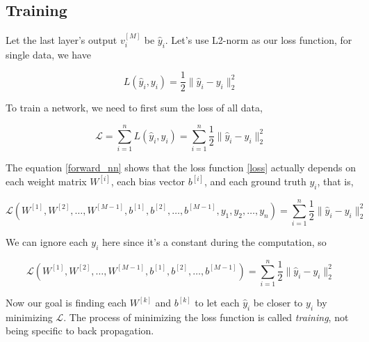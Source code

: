 \documentclass{article}
\begin{document}
        \subsection{Training}

            Let the last layer's output $v_i^{ [M] }$ be $\hat{y}_{i}$. Let's
            use L2-norm as our loss function, for single data, we have

            \begin{equation}\label{loss}
                L(\hat{y}_i, y_i) = \frac{1}{2} \| \hat{y}_i - y_i \|_2^2
            \end{equation}

            To train a network, we need to first sum the loss of all data,

            \begin{equation*}
                \mathcal{L} = \sum_{i=1}^n L(\hat{y}_{i}, y_{i}) =
                \sum_{i=1}^n \frac{1}{2} \| \hat{y}_{i} - y_i \|_2^2
            \end{equation*}

            The equation \ref{forward_nn} shows that the loss function
            \ref{loss} actually depends on each weight matrix $W^{[i]}$, each
            bias vector $b^{ [i] }$, and each ground truth $y_{i}$, that is,

            \begin{equation*}
                \mathcal{L}(W^{ [1] }, W^{ [2] }, \dots, W^{ [M-1] }, b^{ [1] },b^{ [2] },
                \dots, b^{ [M-1] }, y_{1}, y_{2}, \dots, y_n) = \sum_{i=1}^n \frac{1}{2} \| \hat{y}_{i} - y_i \|_2^2
            \end{equation*}

            We can ignore each $y_{i}$ here since it's a constant during the computation, so

            \begin{equation*}
                \mathcal{L}(W^{ [1] }, W^{ [2] }, \dots, W^{ [M-1] }, b^{ [1] },b^{ [2] },
                \dots, b^{ [M-1] }) = \sum_{i=1}^n \frac{1}{2} \| \hat{y}_{i} - y_i \|_2^2
            \end{equation*}
            
            Now our goal is finding each  $W^{ [k] }$ and $b^{ [k] }$ to let
            each $\hat{y}_{i}$ be closer to $y_{i}$ by minimizing
            $\mathcal{L}$. The process of minimizing the loss function is
            called \textit{training}, not being specific to back propagation.
\end{document}
